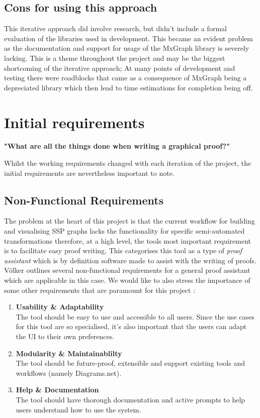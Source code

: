 \documentclass[bsc,frontabs,singlespacing,parskip,deptreport]{infthesis}
\begin{document}
\subsection{Cons for using this approach}

This iterative approach did involve research, but didn't include a formal evaluation of the libraries used in development. This became an evident problem as the documentation and support for usage of the MxGraph library is severely lacking. This is a theme throughout the project and may be the biggest shortcoming of the iterative approach; At many points of development and testing there were roadblocks that came as a consequence of MxGraph being a depreciated library which then lead to time estimations for completion being off. 

\section{Initial requirements}
 
 \begin{center}\textbf{"What are all the things done when writing a graphical proof?" }
\end{center}

Whilst the working requirements changed with each iteration of the project, the initial requirements are nevertheless important to note. 

\subsection{Non-Functional Requirements}
The problem at the heart of this project is that the current workflow for building and visualising SSP graphs lacks the functionality for specific semi-automated transformations therefore, at a high level, the tools most important requirement is to facilitate easy proof writing. This categorises this tool as a type of \textit{proof assistant} which is by definition software made to assist with the writing of proofs. V{\"o}lker\cite{volker2004thoughts} outlines several non-functional requirements for a general proof assistant which are applicable in this case. We would like to also stress the importance of some other requirements that are paramount for this project :
\begin{enumerate}
    \item \textbf{Usability \& Adaptability}\\
    The tool should be easy to use and accessible to all users. Since the use cases for this tool are so specialised, it's also important that the users can adapt the UI to their own preferences. 
    \item \textbf{Modularity \& Maintainablilty}\\
    The tool should be future-proof, extensible and support existing tools and workflows (namely Diagrams.net). 
    \item \textbf{Help \& Documentation}\\
    The tool should have thorough documentation and active prompts to help users understand how to use the system. 
\end{enumerate}
\end{document}
